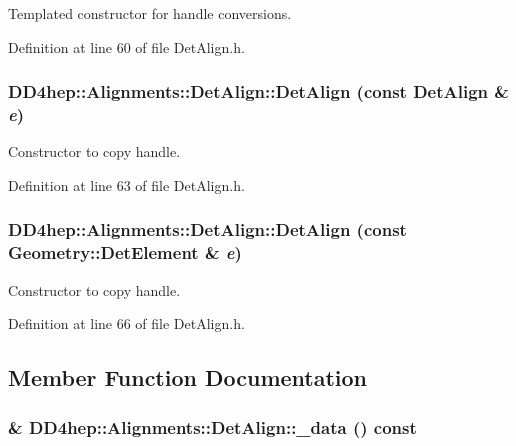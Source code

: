 Templated constructor for handle conversions. 

Definition at line 60 of file DetAlign.h.\hypertarget{class_d_d4hep_1_1_alignments_1_1_det_align_ac322b60733704c92ed78a405f4c2b997}{
\subsubsection[{DetAlign}]{\setlength{\rightskip}{0pt plus 5cm}DD4hep::Alignments::DetAlign::DetAlign (const {\bf DetAlign} \& {\em e})}}
\label{class_d_d4hep_1_1_alignments_1_1_det_align_ac322b60733704c92ed78a405f4c2b997}


Constructor to copy handle. 

Definition at line 63 of file DetAlign.h.\hypertarget{class_d_d4hep_1_1_alignments_1_1_det_align_acb573b6c89a9e18bc272e8b1f2db3ea3}{
\subsubsection[{DetAlign}]{\setlength{\rightskip}{0pt plus 5cm}DD4hep::Alignments::DetAlign::DetAlign (const {\bf Geometry::DetElement} \& {\em e})}}
\label{class_d_d4hep_1_1_alignments_1_1_det_align_acb573b6c89a9e18bc272e8b1f2db3ea3}


Constructor to copy handle. 

Definition at line 66 of file DetAlign.h.

\subsection{Member Function Documentation}
\hypertarget{class_d_d4hep_1_1_alignments_1_1_det_align_ad21cb4ae966882e2b2b3ec268475b82a}{
\subsubsection[{\_\-data}]{\& DD4hep::Alignments::DetAlign::\_\-data () const}}
\label{class_d_d4hep_1_1_alignments_1_1_det_align_ad21cb4ae966882e2b2b3ec268475b82a}


